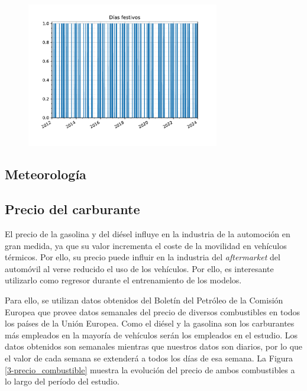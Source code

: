 \begin{figure}[H]
	{\includegraphics[width=0.75\textwidth]{imagenes/grafica_holidays.pdf}}
\end{figure}

\subsection{Meteorología}

\subsection{Precio del carburante}

El precio de la gasolina y del diésel influye en la industria de la automoción en gran medida, ya que su valor incrementa el coste de la movilidad en vehículos térmicos. Por ello, su precio puede influir en la industria del \textit{aftermarket} del automóvil al verse reducido el uso de los vehículos. Por ello, es interesante utilizarlo como regresor durante el entrenamiento de los modelos.

Para ello, se utilizan datos obtenidos del Boletín del Petróleo de la Comisión Europea \cite{petrol} que provee datos semanales del precio de diversos combustibles en todos los países de la Unión Europea. Como el diésel y la gasolina son los carburantes más empleados en la mayoría de vehículos serán los empleados en el estudio. Los datos obtenidos son semanales mientras que nuestros datos son diarios, por lo que el valor de cada semana se extenderá a todos los días de esa semana. La Figura \ref*{3-precio_combustible} muestra la evolución del precio de ambos combustibles a lo largo del período del estudio.

